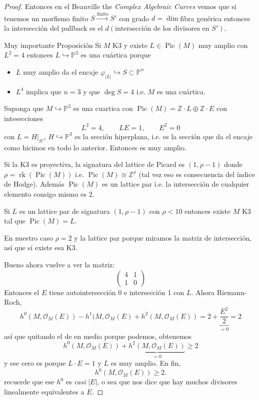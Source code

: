 \begin{proof}
Entonces en el Beauville the \textit{Complex Algebraic Curves} vemos que si tenemos un morfismo finito $S \overset{\operatorname{finito}}{\longrightarrow}S'$ con grado $d=\dim$fibra genérica entonces la intersección del pullback es el $d(\text{intersección de los divisores en $S'$}) $.

\begin{thing6}{Muy importante Proposición}\leavevmode
	Si $M$ K3 y existe  $L\in\operatorname{Pic}(M)$ muy amplio con $L^2=4$ entonces $L\hookrightarrow \mathbb{P}^3$ es una cuártica porque
	\begin{itemize}
	\item $L$ muy amplio da el encaje $\varphi_{|L|}\hookrightarrow S\subset \mathbb{P}^n$
	\item $L^4$ implica que $n=3$ y  que $\operatorname{deg}S=4$ i.e. $M$ es una cuártica.
	\end{itemize}
\end{thing6}

Suponga que $M\hookrightarrow \mathbb{P}^3$ es una cuartica con $\operatorname{Pic}(M) =\mathbb{Z}\cdot L\oplus \mathbb{Z}\cdot E$ con intesecciones
\[L^2=4,\qquad LE=1,\qquad E^2=0\]
con $L=H|_{S'}$, $H \hookrightarrow \mathbb{P}^3$ es la sección hiperplana, i.e. es la sección que da el encaje como hicimos en todo lo anterior. Entonces es muy amplio.

\begin{remark}\leavevmode
	Si la K3 es proyectiva, la signatura del lattice de Picard es $(1,\rho-1)$ donde $\rho=\operatorname{rk}(\operatorname{Pic}(M))$ i.e. $\operatorname{Pic}(M) \cong \mathbb{Z}^\rho$ (tal vez eso es consecuencia del índice de Hodge). Además $\operatorname{Pic}(M)$ es un lattice par i.e. la intersección de cualquier elemento consigo mismo es 2.
\end{remark}


\begin{thm}\leavevmode
	Si $L$ es un lattice par de signatura $(1,\rho-1)$ con $\rho<10$ entonces existe $M$ K3 tal que $\operatorname{Pic}(M) =L$.
\end{thm}

En nuestro caso $\rho=2$ y la lattice par porque miramos la matriz de intersección, así que sí existe esa K3.

Bueno ahora vuelve a ver la matriz:
\[\begin{pmatrix} 4&1\\1&0 \end{pmatrix} \]
Entonces el $E$ tiene autointersección 0 e intersección 1 con $L$. Ahora Riemann-Roch,
\[h^0(M,\mathcal{O}_M(E))-h^1(M,\mathcal{O}_M(E)+h^2(M,\mathcal{O}_M(E))=2+\underbrace{\frac{E^2}{2}}_{=0}=2\]
así que quitando el de en medio porque podemos, obtenemos
\[h^0(M,\mathcal{O}_M(E))+\underbrace{h^2(M,\mathcal{O}_M(E))}_{=0}\geq 2\]
y ese cero es porque $L\cdot E=1$ y $L$ es muy amplio. En fin,
 \[h^0(M,\mathcal{O}_M(E))\geq 2.\]
recuerde que ese $h^0$ es \textit{casi} $|E|$, o sea que nos dice que hay muchos divisores linealmente equivalentes a $E$. 


\end{proof}
